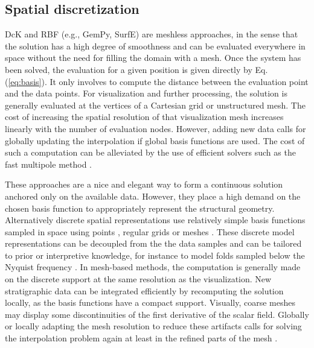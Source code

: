 \documentclass[preprint]{ring20}
\begin{document}
\subsection{Spatial discretization}

DcK and RBF (e.g., GemPy, SurfE) are meshless approaches, in the sense that the solution has a high degree of smoothness and can be evaluated everywhere in space without the need for filling the domain with a mesh. Once the system has been solved, the evaluation for a given position is given directly by Eq. (\ref{eq:basis}). It only involves to compute the distance between the evaluation point and the data points. For visualization and further processing, the solution is generally evaluated at the vertices of a Cartesian grid or unstructured mesh. The cost of increasing the spatial resolution of that visualization mesh increases linearly with the number of evaluation nodes. However, adding new data calls for globally updating the interpolation if global basis functions are used. The cost of such a computation can be alleviated by the use of efficient solvers such as the fast multipole method \citep{greengard_fast_1987}. 

These approaches are a nice and elegant way to form a continuous solution anchored only on the available data. However, they place a high demand on the chosen basis function to appropriately represent the structural geometry. Alternatively discrete spatial representations use relatively simple basis functions sampled in space using points \citet[][, e.g., MSS]{Renaudeau2019MG}, regular grids \citep[][, e.g., SIGMA]{Irakarama2021MG} or meshes \citep[][, e.g., LoopStructural, SIGMA, StructuralLab] {Frank2007CG}. These discrete model representations can be decoupled from the the data samples and can be tailored to prior or interpretive knowledge, for instance to model folds sampled below the Nyquist frequency \citep{Grose2018JGRSE}. In mesh-based methods, the computation is generally made on the discrete support at the same resolution as the visualization. New stratigraphic data can be integrated efficiently by recomputing the solution locally, as the basis functions have a compact support. Visually, coarse meshes may display some discontinuities of the first derivative of the scalar field. Globally or locally adapting the mesh resolution to reduce these artifacts calls for solving the interpolation problem again at least in the refined parts of the mesh \citep{Frank2007CG}. 
\end{document}
